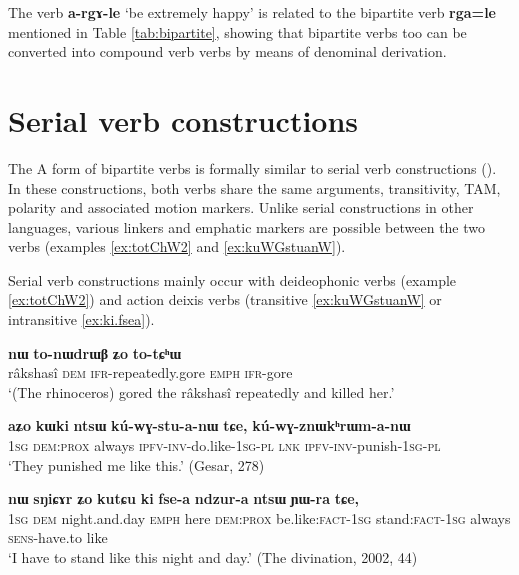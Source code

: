 \documentclass[oldfontcommands,oneside,a4paper,11pt]{article}
\newcommand{\ipa}[1]{{\phon\textbf{#1}}}
\newcommand{\jpg}[2]{\ipa{#1} `#2'}
\begin{document}
The verb \jpg{a-rgɤ-le}{be extremely happy} is related to the bipartite verb \ipa{rga=le} mentioned in Table \ref{tab:bipartite}, showing that bipartite verbs too can be converted into compound verb verbs by means of denominal derivation.

\section{Serial verb constructions} \label{sec:serial}
The A form of bipartite verbs is formally similar to serial verb constructions (\citealt{sun12complementation, jacques13harmonization}). In these constructions, both verbs share the same arguments, transitivity, TAM, polarity and associated motion markers. Unlike serial constructions in other languages, various linkers and emphatic markers are possible between the two verbs (examples \ref{ex:totChW2} and \ref{ex:kuWGstuanW}).

Serial verb constructions mainly occur with deideophonic verbs (example \ref{ex:totChW2}) and action deixis verbs (transitive \ref{ex:kuWGstuanW} or intransitive \ref{ex:ki.fsea}).

\begin{exe}
\ex \label{ex:totChW2}
\gll 	\ipa{srɯnmɯ} 	\ipa{nɯ} 	\ipa{to-nɯdrɯβ} 	\ipa{ʑo} 	 	\ipa{to-tɕʰɯ} \\
 râkshasî \textsc{dem}  \textsc{ifr}-repeatedly.gore  \textsc{emph}  \textsc{ifr}-gore \\
 \glt `(The rhinoceros) gored the râkshasî repeatedly and killed her.' 
\end{exe}	

\begin{exe}
\ex \label{ex:kuWGstuanW}
\gll 	
 \ipa{aʑo} 	\ipa{kɯki} 	\ipa{ntsɯ} 	\ipa{kú-wɣ-stu-a-nɯ} 	\ipa{tɕe,} 	\ipa{kú-wɣ-znɯkʰrɯm-a-nɯ} \\
 \textsc{1sg} \textsc{dem:prox} always \textsc{ipfv-inv}-do.like-\textsc{1sg-pl} \textsc{lnk} \textsc{ipfv-inv}-punish-\textsc{1sg-pl} \\
 \glt `They punished me like this.' (Gesar, 278)
\end{exe}	

\begin{exe}
\ex \label{ex:ki.fsea}
\gll \ipa{aʑo} 	\ipa{nɯ} 	\ipa{sŋiɕɤr} 	\ipa{ʑo} 	\ipa{kutɕu} 	\ipa{ki} 	\ipa{fse-a} 	\ipa{ndzur-a} 	\ipa{ntsɯ} 	\ipa{ɲɯ-ra} 	\ipa{tɕe,} \\
\textsc{1sg} \textsc{dem} night.and.day \textsc{emph} here \textsc{dem:prox} be.like:\textsc{fact-1sg} stand:\textsc{fact-1sg} always \textsc{sens}-have.to like \\
\glt `I have to stand like this night and day.' (The divination, 2002, 44)
\end{exe}
\end{document}
